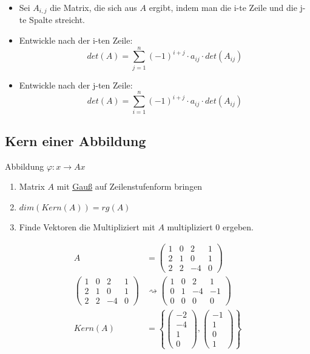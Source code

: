 \documentclass{scrartcl}
\newcommand{\linkToRef}[2][ref]{\hyperref[#1]{\underline{#2}}}
\begin{document}
\begin{itemize}
\item Sei $A_{i,j}$ die Matrix, die sich aus $A$ ergibt, indem man die i-te Zeile und die j-te Spalte streicht.
\item Entwickle nach der i-ten Zeile:
\[det (A) = \sum_{j=1}^{n} (-1)^{i+j} \cdot a_{ij} \cdot det(A_{ij}) \]
\item Entwickle nach der j-ten Zeile:
\[det (A) = \sum_{i=1}^{n} (-1)^{i+j} \cdot a_{ij} \cdot det(A_{ij}) \]
\end{itemize}


\subsection{Kern einer Abbildung}

Abbildung \(\varphi: x \rightarrow Ax\)
\begin{enumerate}[label={(\arabic*)}]
    \item Matrix $A$ mit \linkToRef[Gauss]{Gauß} auf Zeilenstufenform bringen
    \item $dim(Kern(A)) = rg(A)$
    \item Finde Vektoren die Multipliziert mit $A$ multipliziert 0 ergeben.
\end{enumerate}

\begin{Beispiel}
    \begin{align*}
        A &= \begin{pmatrix} 1 & 0 & 2 & 1 \\
2 & 1 & 0  & 1 \\
2 & 2 & -4 & 0
\end{pmatrix}\\
        \begin{pmatrix} 1 & 0 & 2 & 1 \\
        2 & 1 & 0  & 1 \\
        2 & 2 & -4 & 0
        \end{pmatrix} &\rightsquigarrow \begin{pmatrix} 1 & 0 & 2 & 1 \\
        0 & 1 & -4  & -1 \\
        0 & 0 & 0 & 0
        \end{pmatrix}\\
        Kern(A) &= \left\{ \begin{pmatrix} -2 \\ -4 \\ 1 \\ 0 \end{pmatrix}, \begin{pmatrix} -1 \\ 1 \\ 0 \\ 1 \end{pmatrix} \right\}
    \end{align*}
\end{Beispiel}
\end{document}
